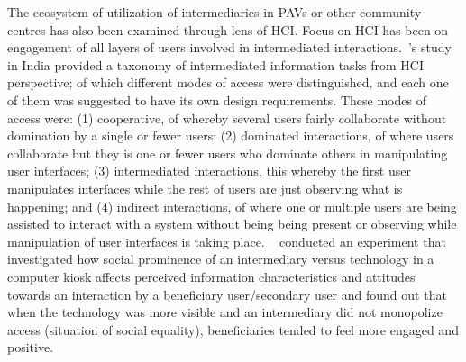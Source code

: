 The ecosystem of utilization of intermediaries in PAVs or other community centres has also been examined through lens of HCI. Focus on HCI has been on engagement of all layers of users involved in intermediated interactions.~\cite{parikh2006}'s study in India provided a taxonomy of intermediated information tasks from HCI perspective; of which different modes of access were distinguished, and each one of them was suggested to have its own design requirements. These modes of access were: (1) cooperative, of whereby several users fairly collaborate without domination by a single or fewer users; (2) dominated interactions, of where users collaborate but they is one or fewer users who dominate others in manipulating user interfaces; (3) intermediated interactions, this whereby the first user manipulates interfaces while the  rest of users are just observing what is happening; and (4) indirect interactions, of where one or multiple users are being assisted to interact with a system without being being present or observing while manipulation of user interfaces is taking place. ~\cite{sukumaran2009intermediated} conducted an experiment that investigated how social prominence of an intermediary versus technology in a computer kiosk affects perceived information characteristics and attitudes towards an interaction by a beneficiary user/secondary user and found out that when the technology was more visible and an intermediary did not monopolize access (situation of social equality), beneficiaries tended to feel more engaged and positive. 

